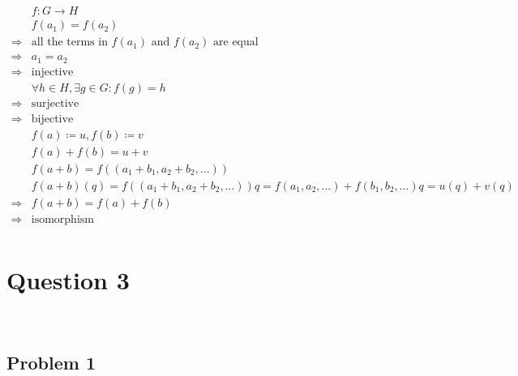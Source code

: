 \documentclass{article}
\begin{document}
\begin{equation*}
    \begin{split}
        &f:G\rightarrow H\\
        &f(a_1)=f(a_2)\\
        \Rightarrow&\text{all the terms in }f(a_1)\text{ and }f(a_2)\text{ are equal}\\
        \Rightarrow&a_1=a_2\\
        \Rightarrow&\text{injective}\\
        &\forall h\in H,\exists g\in G:f(g)=h\\
        \Rightarrow&\text{surjective}\\
        \Rightarrow&\text{bijective}\\
        &f(a)\coloneqq u,f(b)\coloneqq v\\
        &f(a)+f(b)=u+v\\
        &f(a+b)=f((a_1+b_1,a_2+b_2,...))\\
        &f(a+b)(q)=f((a_1+b_1,a_2+b_2,...))q=f(a_1,a_2,...)+f(b_1,b_2,...)q=u(q)+v(q)\\
        \Rightarrow&f(a+b)=f(a)+f(b)\\
        \Rightarrow&\text{isomorphism}\\
    \end{split}
\end{equation*}

\newpage

\section*{Question 3}

~

\subsection*{Problem 1}

~
\end{document}
